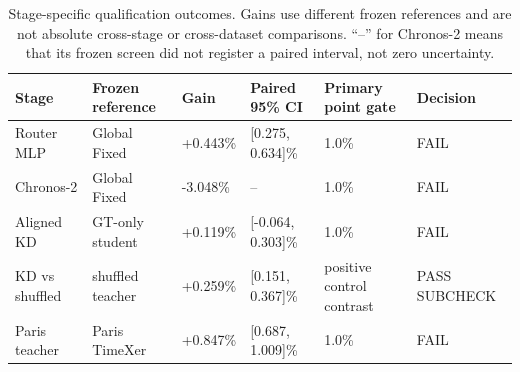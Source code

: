 \begin{table}[t]
\centering
\caption{Stage-specific qualification outcomes. Gains use different frozen references and are not absolute cross-stage or cross-dataset comparisons. ``--'' for Chronos-2 means that its frozen screen did not register a paired interval, not zero uncertainty.}
\label{tab:gates}
\scriptsize
\begin{tabular}{llllll}
\toprule
Stage & Frozen reference & Gain & Paired 95\% CI & Primary point gate & Decision \\
\midrule
Router MLP & Global Fixed & +0.443\% & [0.275, 0.634]\% & 1.0\% & FAIL \\
Chronos-2 & Global Fixed & -3.048\% & -- & 1.0\% & FAIL \\
Aligned KD & GT-only student & +0.119\% & [-0.064, 0.303]\% & 1.0\% & FAIL \\
KD vs shuffled & shuffled teacher & +0.259\% & [0.151, 0.367]\% & positive control contrast & PASS SUBCHECK \\
Paris teacher & Paris TimeXer & +0.847\% & [0.687, 1.009]\% & 1.0\% & FAIL \\
\bottomrule
\end{tabular}
\end{table}
